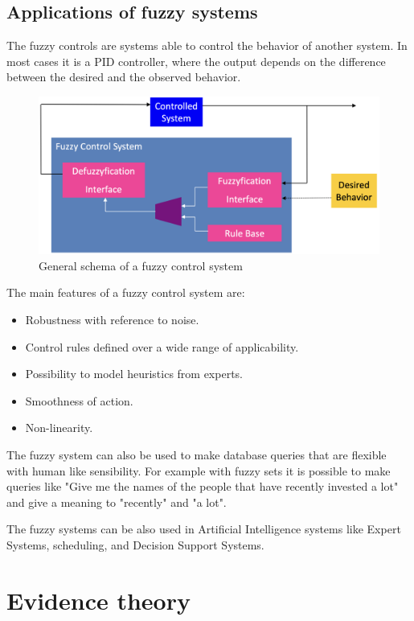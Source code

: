 \documentclass[12pt, a4paper]{report}
\newtheorem[L]{theorem}{Theorem}
\newtheorem[M]{corollary}{Corollary}
\newtheorem[M]{lemma}{Lemma}
\newtheorem[style=S,bodystyle=\normalfont]{definition}{Definition}
\begin{document}
    \section{Applications of fuzzy systems}
    The fuzzy controls are systems able to control the behavior of another system. In most cases it is a PID controller, where the output
    depends on the difference between the desired and the observed behavior. 
    \begin{figure}[H]
        \centering
        \includegraphics[width=0.5\linewidth]{images/control.png}
        \caption{General schema of a fuzzy control system}
    \end{figure}
    The main features of a fuzzy control system are: 
    \begin{itemize}
        \item Robustness with reference to noise.
        \item Control rules defined over a wide range of applicability.
        \item Possibility to model heuristics from experts.
        \item Smoothness of action.
        \item Non-linearity.
    \end{itemize}

    The fuzzy system can also be used to make database queries that are flexible with human like sensibility. For example with fuzzy sets it
    is possible to make queries like "Give me the names of the people that have recently invested a lot" and give a meaning to "recently" and 
    "a lot". 

    The fuzzy systems can be also used in Artificial Intelligence systems like Expert Systems, scheduling, and Decision Support Systems.

    \newpage

    \chapter{Evidence theory}
\end{document}
